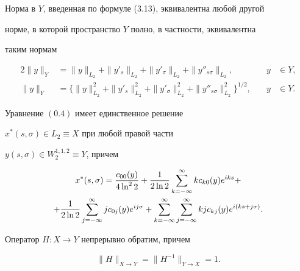 Норма в $Y$, введенная по формуле (3.13), эквивалентна любой другой 


норме, в которой пространство $Y$ полно, в частности, эквивалентна 


таким нормам


\begin{alignat}{2}


\|y\|_Y &= \|y\|_{L_2}+\|y'_s\|_{L_2}+\|y'_\sigma\|_{L_2}+


\|y''_{s\sigma}\|_{L_2},&\quad y&\in Y, \\


%


\|y\|_Y &= \{\|y\|^2_{L_2}+ \|y'_s\|_{L_2}^2+\|y'_{\sigma}\|_{L_2}^2+


\|y''_{s\sigma}\|_{L_2}^2\}^{1/2},&\quad y&\in Y.


\end{alignat}





\begin{thms}


Уравнение $(0.4)$ имеет единственное решение


$x^*(s,\sigma)\in L_2 \equiv X$  при любой правой части


$y(s,\sigma)\in W_2^{1,1,2} \equiv Y$, причем 


\begin{multline}


x^*(s,\sigma) = \frac{c_{00}(y)}{4\ln^2 2}+\frac{1}{2\ln 2}


\suml_{k=-\infty}^\infty k c_{k0}(y)e^{iks}+ \\


%


+\frac{1}{2\ln 2}\suml_{j=-\infty}^\infty j c_{0j}(y)e^{ij\sigma} +


\suml_{k=-\infty}^\infty


\suml_{j=-\infty}^\infty kjc_{kj}(y)e^{i(ks+j\sigma)}.


\end{multline}


\end{thms}





\begin{cornonum}


Оператор $H:X\to Y$ непрерывно обратим, причем


\begin{equation}


\|H\|_{X\to Y} = \|H^{-1}\|_{Y\to X} = 1.


\end{equation}


\end{cornonum}





